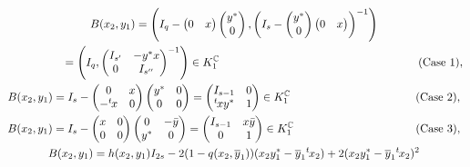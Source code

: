\documentclass[pdftex]{sigma}
\numberwithin{equation}{section}
\newcommand{\BC}{\mathbb{C}}
\begin{document}
\begin{gather*}
 B(x_2,y_1)=\left(I_q-\begin{pmatrix}0&x\end{pmatrix}\begin{pmatrix}y^*\\0\end{pmatrix},
\left(I_s-\begin{pmatrix}y^*\\0\end{pmatrix}\begin{pmatrix}0&x\end{pmatrix}\right)^{-1}\right) \\
 \hphantom{B(x_2,y_1)=}{} =\left(I_q,\begin{pmatrix}I_{s'}&-y^*x\\0&I_{s''}\end{pmatrix}^{-1}\right)\in K_1^\BC \hspace{62mm} (\text{Case }1), \\
 B(x_2,y_1)=I_s-\begin{pmatrix}0&x\\-{}^t\hspace{-1pt}x&0\end{pmatrix}\begin{pmatrix}y^*&0\\0&0\end{pmatrix}
=\begin{pmatrix}I_{s-1}&0\\{}^t\hspace{-1pt}xy^*&1\end{pmatrix}\in K_1^\BC\hspace{39mm} (\text{Case }2), \\
 B(x_2,y_1)=I_s-\begin{pmatrix}x&0\\0&0\end{pmatrix}\begin{pmatrix}0&-\bar{y}\\y^*&0\end{pmatrix}
=\begin{pmatrix}I_{s-1}&x\bar{y}\\0&1\end{pmatrix}\in K_1^\BC\hspace{38mm} (\text{Case }3), \\
B(x_2,y_1) =h(x_2,y_1)I_{2s}-2(1-q(x_2,\overline{y}_1))(x_2y^*_1-\overline{y}_1{}^t\hspace{-1pt}x_2)
+2(x_2y^*_1-\overline{y}_1{}^t\hspace{-1pt}x_2)^2 \\

\end{gather*}
\end{document}
